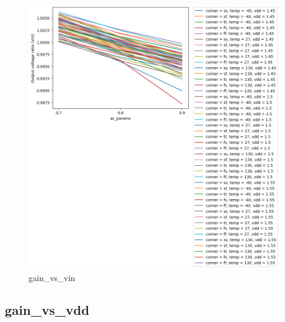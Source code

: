 \documentclass[
  a4paper,
  DIV=11,
  numbers=noendperiod]{scrartcl}
\begin{document}
\begin{tcolorbox}
\begin{figure}[H]
{\centering \includegraphics{./cace/_docs/ota-5t/schematic/gain_vs_vin.png}

}

\caption{gain\_vs\_vin}

\end{figure}%

\subsection*{gain\_vs\_vdd}\label{gain_vs_vdd}

\begin{figure}[H]


\end{figure}
\end{tcolorbox}
\end{document}
